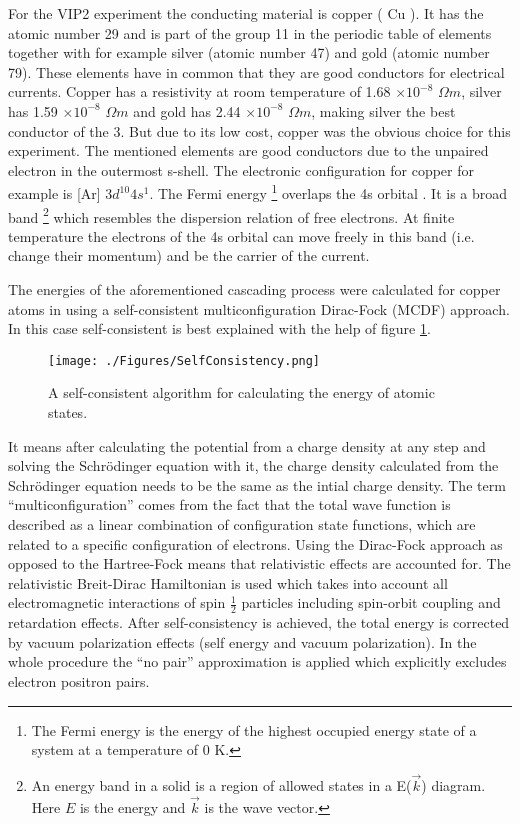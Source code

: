 For the VIP2 experiment the conducting material is copper ( Cu ). It has the atomic number 29 and is part of the group 11 in the periodic table of elements together with for example silver (atomic number 47) and gold (atomic number 79). These elements have in common that they are good conductors for electrical currents. Copper has a resistivity at room temperature of 1.68 $\times 10^{-8}$ $\Omega m $, silver has 1.59 $\times 10^{-8}$ $\Omega m $ and gold has 2.44 $\times 10^{-8}$ $\Omega m $, making silver the best conductor of the 3. But due to its low cost, copper was the obvious choice for this experiment. The mentioned elements are good conductors due to the unpaired electron in the outermost s-shell. The electronic configuration for copper for example is [Ar] $3d^{10}4s^{1}$. The Fermi energy \footnote{The Fermi energy is the energy of the highest occupied energy state of a system at a temperature of 0 K.} overlaps the 4s orbital \cite{Hilscher2009}. It is a broad band \footnote{An energy band in a solid is a region of allowed states in a E($\vec{k}$) diagram. Here $E$ is the energy and $\vec{k}$ is the wave vector.} which resembles the dispersion relation of free electrons. At finite temperature the electrons of the 4s orbital can move freely in this band (i.e. change their momentum) and be the carrier of the current. 

The energies of the aforementioned cascading process were calculated for copper atoms in \cite{DiMatteo2005} using a self-consistent multiconfiguration Dirac-Fock (MCDF) approach. In this case self-consistent is best explained with the help of figure \ref{fig:SelfCons}.
\begin{figure}[h]
 \centering
 \texttt{[image: ./Figures/SelfConsistency.png]}
 \caption{A self-consistent algorithm for calculating the energy of atomic states.}
 \label{fig:SelfCons}
\end{figure}
It means after calculating the potential from a charge density at any step and solving the Schrödinger equation with it, the charge density calculated from the Schrödinger equation needs to be the same as the intial charge density. The term ``multiconfiguration'' comes from the fact that the total wave function is described as a linear combination of configuration state functions, which are related to a specific configuration of electrons. Using the Dirac-Fock approach as opposed to the Hartree-Fock means that relativistic effects are accounted for. The relativistic Breit-Dirac Hamiltonian is used which takes into account all electromagnetic interactions of spin $\frac{1}{2}$ particles including spin-orbit coupling and retardation effects. After self-consistency is achieved, the total energy is corrected by vacuum polarization effects (self energy and vacuum polarization). In the whole procedure the ``no pair'' approximation is applied which explicitly excludes electron positron pairs.

